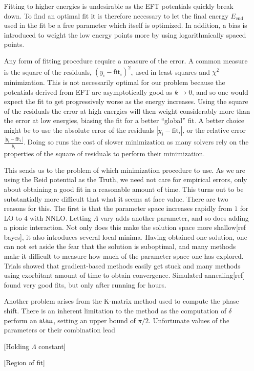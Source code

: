 Fitting to higher energies is undesirable as the EFT potentials quickly break
down. To find an optimal fit it is therefore necessary to let the final energy
\(E_{\mathrm{end}}\) used in the fit be a free parameter which itself is
optimized. In addition, a bias is introduced to weight the low energy points
more by using logarithmically spaced points.

Any form of fitting procedure require a measure of the error. A common measure
is the square of the residuals, \(\left( y_{i} - \mathrm{fit}_{i} \right)^{2}\), used
in least squares and \(\chi^{2}\) minimization. This is not necessarily optimal
for our problem because the potentials derived from EFT are asymptotically good
as \(k\to 0\), and so one would expect the fit to get progressively worse as the
energy increases. Using the square of the residuals the error at high energies
will then weight considerably more
than the error at low energies, biasing the fit for a better ``global'' fit. A
better choice might be to use the absolute error of the residuals
\(|y_{i}-\mathrm{fit}_{i}|\), or the relative error
\(\frac{|y_{i}-\mathrm{fit}_{i}|}{y_{i}}\).
Doing so runs the cost of slower minimization as many solvers rely on the
properties of the square of residuals to perform their minimization. 

This sends us to the problem of which minimization procedure to use. As we are
using the Reid potential as the Truth, we need not care for empirical errors,
only about obtaining a good fit in a reasonable amount of time. This turns out
to be substantially more difficult that what it seems at face value. There are
two reasons for this. The first is that the parameter space increases rapidly
from \(1\) for LO to \(4\) with \(\mathrm{NNLO}\). Letting \(\Lambda\) vary adds
another parameter, and so does adding a pionic interaction. Not only does this
make the solution space more shallow[ref bayes], it also introduces several
local minima. Having obtained one solution, one can not set aside the fear that
the solution is suboptimal, and many methods make it difficult to measure how
much of the parameter space one has explored. Trials showed that gradient-based
methods easily get stuck and many methods using exorbitant amount of time to
obtain convergence. Simulated annealing[ref] found very good fits, but only
after running for hours.

Another problem arises from the K-matrix method used to compute the phase shift.
There is an inherent limitation to the method as the computation of \(\delta\)
perform an \(\atan\), setting an upper bound of \(\pi/2\). Unfortunate values of
the parameters or their combination lead


[Holding \(\Lambda\) constant]

[Region of fit]

